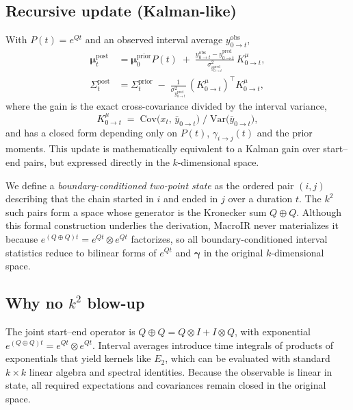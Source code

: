 \documentclass[9pt]{elife}
\begin{document}
\subsection*{Recursive update (Kalman-like)}
With $P(t)=e^{Qt}$ and an observed interval average $y^{\mathrm{obs}}_{0\to t}$,
\begin{align}
\bm{\mu}^{\mathrm{post}}_{t} &= \bm{\mu}^{\mathrm{prior}}_0 P(t) \;+\; \frac{y^{\mathrm{obs}}_{0\to t}-y^{\mathrm{pred}}_{0\to t}}{\sigma^2_{y^{\mathrm{pred}}_{0\to t}}}\,K^\mu_{0\to t},\\
\Sigma^{\mathrm{post}}_{t} &= \Sigma^{\mathrm{prior}}_{t} \;-\; \frac{1}{\sigma^2_{y^{\mathrm{pred}}_{0\to t}}}\,(K^\mu_{0\to t})^\top K^\mu_{0\to t},
\end{align}
where the gain is the exact cross-covariance divided by the interval variance,
\begin{equation}
K^\mu_{0\to t} \;=\; \mathrm{Cov}\!\big(x_t,\,\bar y_{0\to t}\big) \;\big/ \; \mathrm{Var}\!\big(\bar y_{0\to t}\big),
\end{equation}
and has a closed form depending only on $P(t)$, $\gamma_{i\to j}(t)$ and the prior moments. This update is mathematically equivalent to a Kalman gain over start--end pairs, but expressed directly in the $k$-dimensional space.

\begin{tcolorbox}[colback=gray!5,colframe=gray!50,title=Boundary-conditioned two-point states (``meta-states'')]
We define a \emph{boundary-conditioned two-point state} as the ordered pair $(i,j)$ describing that the chain started in $i$ and ended in $j$ over a duration $t$. The $k^2$ such pairs form a space whose generator is the Kronecker sum $Q\oplus Q$. Although this formal construction underlies the derivation, MacroIR never materializes it because $e^{(Q\oplus Q)t}=e^{Qt}\otimes e^{Qt}$ factorizes, so all boundary-conditioned interval statistics reduce to bilinear forms of $e^{Qt}$ and $\bm{\gamma}$ in the original $k$-dimensional space.
\end{tcolorbox}

\subsection*{Why no $k^2$ blow-up}
The joint start--end operator is $Q\oplus Q=Q\otimes I + I\otimes Q$, with exponential $e^{(Q\oplus Q)t}=e^{Qt}\otimes e^{Qt}$. Interval averages introduce time integrals of products of exponentials that yield kernels like $E_2$, which can be evaluated with standard $k\times k$ linear algebra and spectral identities. Because the observable is linear in state, all required expectations and covariances remain closed in the original space.
\end{document}
